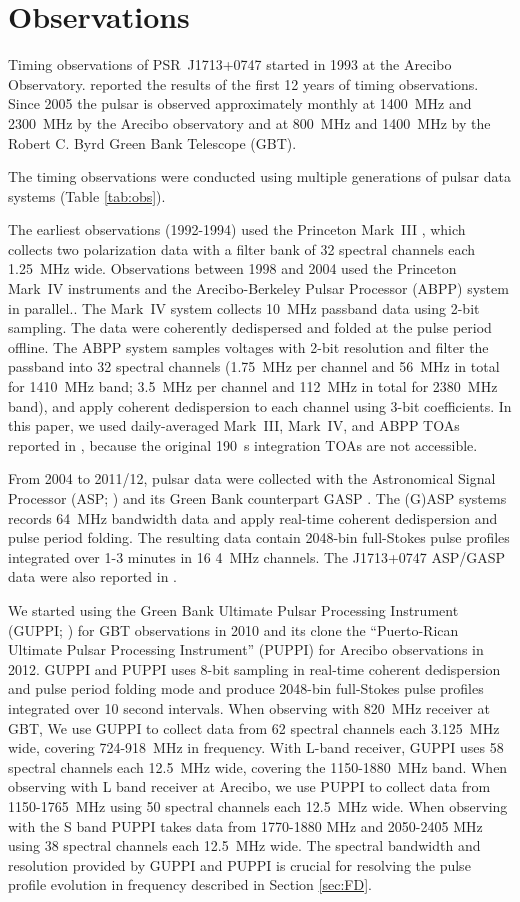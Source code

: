 \section{Observations}
Timing observations of PSR~J1713+0747 started in 1993 at the Arecibo
Observatory. \citet{sns+05} reported the results of the first 12 years
of timing observations. Since 2005 the pulsar is observed approximately monthly
at 1400~MHz and 2300~MHz by the Arecibo
observatory and at 800~MHz and 1400~MHz by the Robert C. Byrd Green Bank
Telescope (GBT).

The timing observations were conducted using multiple generations of pulsar
data systems (Table \ref{tab:obs}).
{\bfref
The earliest observations (1992-1994) used the Princeton Mark~III
\citep{skn+92}, which collects two polarization data with a filter bank of 32
spectral channels each 1.25~MHz wide. 
Observations between 1998 and 2004 used the Princeton Mark~IV
\citep{sst+00} instruments and the Arecibo-Berkeley Pulsar Processor
(ABPP) system \citep{bdz+97} in parallel.. 
The Mark~IV system collects 10~MHz 
passband data using 2-bit sampling. The
data were coherently dedispersed and folded at the pulse period offline.
The ABPP system samples voltages with 2-bit resolution and filter the passband 
into 32 spectral channels (1.75~MHz
per channel and 56~MHz in total for 1410~MHz band; 3.5~MHz per channel and 
112~MHz in total for 2380~MHz band), and apply coherent dedispersion to each
channel using 3-bit coefficients. 
In this paper, we used daily-averaged Mark~III, Mark~IV, and ABPP TOAs reported in \citet{sns+05}, because the original 190~s integration TOAs are not accessible.

From 2004 to 2011/12, pulsar data were collected with the Astronomical Signal
Processor (ASP; \citealt{dem07}) and its Green Bank counterpart GASP \citep{dem07}.
The (G)ASP systems records 64~MHz bandwidth data and apply real-time
coherent dedispersion and pulse period folding. The resulting data contain
2048-bin full-Stokes pulse profiles integrated over 1-3 minutes in 16 4~MHz channels. 
The J1713+0747 ASP/GASP data were also reported in \citet{dfg+13}.

We started using 
the Green Bank Ultimate Pulsar Processing Instrument (GUPPI; \citealt{GUPPI}) for GBT 
observations in 2010 and its clone the ``Puerto-Rican Ultimate Pulsar Processing Instrument''
(PUPPI) for Arecibo observations in 2012. 
GUPPI and PUPPI uses 8-bit sampling in real-time coherent dedispersion and
pulse period folding mode and produce 2048-bin full-Stokes
pulse profiles integrated over 10 second intervals.
When observing with 820~MHz receiver at GBT, We use GUPPI to collect data from 62 spectral 
channels each 3.125~MHz wide, covering 724-918~MHz in frequency. With L-band receiver, GUPPI
uses 58 spectral channels each 12.5~MHz wide, covering the 1150-1880~MHz band. 
When observing with L band receiver at Arecibo, we use PUPPI to collect data from 1150-1765~MHz
using 50 spectral channels each 12.5~MHz wide. When observing with the S band
PUPPI takes data from 1770-1880 MHz and 2050-2405 MHz using 38 spectral
channels each 12.5~MHz wide.
The spectral bandwidth and resolution provided by GUPPI and PUPPI is crucial for resolving the pulse profile evolution in frequency described in Section \ref{sec:FD}.

}
